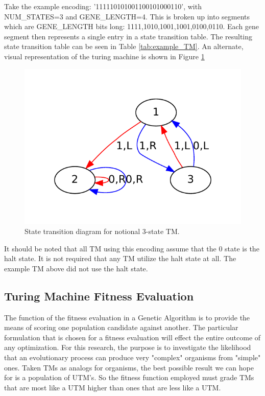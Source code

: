 Take the example encoding: '111110101001100101000110', with NUM\_STATES=3 and GENE\_LENGTH=4. This is broken up into segments which are GENE\_LENGTH bits long: 1111,1010,1001,1001,0100,0110. Each gene segment then represents a single entry in a state transition table. The resulting state transition table can be seen in Table \ref{tab:example_TM}. An alternate, visual representation of the turing machine is shown in Figure \ref{fig:example_TM}

\begin{figure}[!hbp]
	\centering 
	\includegraphics[width=.8\textwidth]{images/example_TM}
	\caption{State transition diagram for notional 3-state TM.}
	\label{fig:example_TM}
\end{figure}

It should be noted that all TM using this encoding assume that the 0 state is the halt state. It is not required that any TM utilize the halt state at all. The example TM above did not use the halt state. 

\subsection{Turing Machine Fitness Evaluation} 

The function of the fitness evaluation in a Genetic Algorithm is to provide the means of scoring one population candidate against another. The particular formulation that is chosen for a fitness evaluation will effect the entire outcome of any optimization. For this research, the purpose is to investigate the likelihood that an evolutionary process can produce very "complex" organisms from "simple" ones. Taken TMs as analogs for organisms, the best possible result we can hope for is a population of UTM's. So the fitness function employed must grade TMs that are most like a UTM higher than ones that are less like a UTM.  

